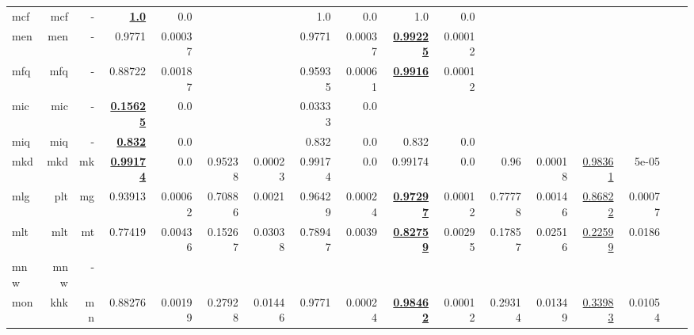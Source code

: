 \documentclass[11pt]{article}
\begin{document}
\begin{table*}[h]
{\begin{tabular}{lrrrrrrrrrrrrrrrr}
mcf         & mcf         & -         & \textbf{\underline{1.0}}         & 0.0         &          &          & 1.0         & 0.0         & 1.0         & 0.0         &          &          &          &          \\
men         & men         & -         & 0.9771         & 0.00037         &          &          & 0.9771         & 0.00037         & \textbf{\underline{0.99225}}         & 0.00012         &          &          &          &          \\
mfq         & mfq         & -         & 0.88722         & 0.00187         &          &          & 0.95935         & 0.00061         & \textbf{\underline{0.9916}}         & 0.00012         &          &          &          &          \\
mic         & mic         & -         & \textbf{\underline{0.15625}}         & 0.0         &          &          & 0.03333         & 0.0         &          &          &          &          &          &          \\
miq         & miq         & -         & \textbf{\underline{0.832}}         & 0.0         &          &          & 0.832         & 0.0         & 0.832         & 0.0         &          &          &          &          \\
mkd         & mkd         & mk         & \textbf{\underline{0.99174}}         & 0.0         & 0.95238         & 0.00023         & 0.99174         & 0.0         & 0.99174         & 0.0         & 0.96         & 0.00018         & \underline{0.98361}         & 5e-05         \\
mlg         & plt         & mg         & 0.93913         & 0.00062         & 0.70886         & 0.0021         & 0.96429         & 0.00024         & \textbf{\underline{0.97297}}         & 0.00012         & 0.77778         & 0.00146         & \underline{0.86822}         & 0.00077         \\
mlt         & mlt         & mt         & 0.77419         & 0.00436         & 0.15267         & 0.03038         & 0.78947         & 0.0039         & \textbf{\underline{0.82759}}         & 0.00295         & 0.17857         & 0.02516         & \underline{0.22599}         & 0.0186         \\
mnw         & mnw         & -         &          &          &          &          &          &          &          &          &          &          &          &          \\
mon         & khk         & mn         & 0.88276         & 0.00199         & 0.27928         & 0.01446         & 0.9771         & 0.00024         & \textbf{\underline{0.98462}}         & 0.00012         & 0.29314         & 0.01349         & \underline{0.33983}         & 0.01054         \\

\end{tabular}}
\end{table*}
\end{document}
